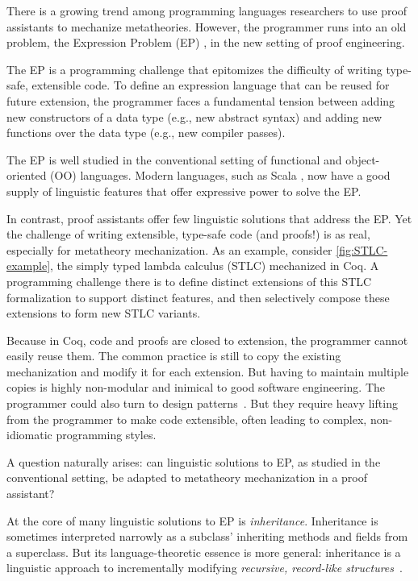 
There is a growing trend among programming languages researchers
to use proof assistants to mechanize meta\-theories.
%
However, the programmer runs into an old problem,
the Expression Problem (EP) \cite{wadler-ep},
in the new setting of proof engineering.

The EP is a programming challenge that
epitomizes the difficulty of writing type-safe, extensible code.
To define an expression language that can be reused for future extension,
the programmer faces a fundamental tension \cite{reynolds1975} between
adding new constructors of a data type (e.g., new abstract syntax) and
adding new functions over the data type (e.g., new compiler passes).

The EP is well studied in the conventional setting of functional and
object-oriented (OO) languages.
Modern languages, such as Scala \cite{scala-oopsla05}, now have a good
supply of linguistic features that offer expressive power to solve the
EP.

In contrast, proof assistants offer few linguistic solutions that
address the EP.
Yet the challenge of writing extensible, type-safe code (and proofs!) is
as real, especially for metatheory mechanization.
As an example, consider \cref{fig:STLC-example}, the simply typed
lambda calculus (STLC) mechanized in Coq.
A programming challenge there is to define distinct extensions of this
STLC formalization to support distinct features,
and then selectively compose these extensions to form new STLC variants.

Because in Coq, code and proofs are closed to extension, the programmer
cannot easily reuse them.
The common practice is still to copy the existing mechanization and
modify it for each extension.
But having to maintain multiple copies is highly non-modular and
inimical to good software engineering.
%
The programmer could also turn to design patterns~\cite{delaware2011,delaware2013}.
But they require heavy lifting from the programmer to make code
extensible, often leading to complex, non-idiomatic programming styles.

A question naturally arises: can linguistic solutions to EP, as studied
in the conventional setting, be adapted to metatheory mechanization in
a proof assistant?

At the core of many linguistic solutions to EP is \emph{inheritance}.
Inheritance is sometimes interpreted narrowly as a subclass'
inheriting methods and fields from a superclass.
But its language-theoretic essence is more general:
inheritance is a linguistic approach to incrementally
modifying \emph{recursive, record-like structures}~\cite{cook1990inheritance}.

